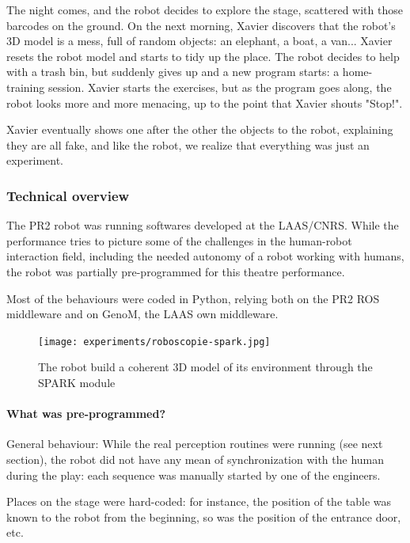 The night comes, and the robot decides to explore the stage, scattered with
those barcodes on the ground. On the next morning, Xavier discovers that the
robot's 3D model is a mess, full of random objects: an elephant, a boat, a
van... Xavier resets the robot model and starts to tidy up the place. The robot
decides to help with a trash bin, but suddenly gives up and a new program
starts: a home-training session. Xavier starts the exercises, but as the
program goes along, the robot looks more and more menacing, up to the point
that Xavier shouts "Stop!".

Xavier eventually shows one after the other the objects to the robot,
explaining they are all fake, and like the robot, we realize that everything
was just an experiment.

\subsubsection{Technical overview}

The PR2 robot was running softwares developed at the LAAS/CNRS. While the
performance tries to picture some of the challenges in the human-robot
interaction field, including the needed autonomy of a robot working with
humans, the robot was partially pre-programmed for this theatre performance.

Most of the behaviours were coded in Python, relying both on the PR2 ROS
middleware and on {\sc GenoM}, the LAAS own middleware.

\begin{figure}
    \centering
    \texttt{[image: experiments/roboscopie-spark.jpg]}
    \caption{The robot build a coherent 3D model of its environment through the
    SPARK module}
    \label{fig|spark}
\end{figure}

\paragraph{What was pre-programmed?}

General behaviour: While the real perception routines were running
(see next section), the robot did not have any mean of synchronization with the
human during the play: each sequence was manually started by one of the
engineers.

Places on the stage were hard-coded: for instance, the position of the table
was known to the robot from the beginning, so was the position of the entrance
door, etc.

